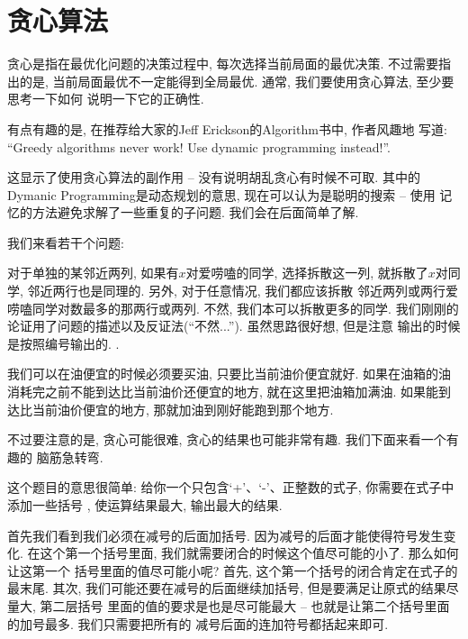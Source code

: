 \section{贪心算法}

贪心是指在最优化问题的决策过程中, 每次选择当前局面的最优决策. 不过需要指出的是, 
当前局面最优不一定能得到全局最优. 通常, 我们要使用贪心算法, 至少要思考一下如何
说明一下它的正确性. 

\begin{remark}
    有点有趣的是, 在推荐给大家的Jeff Erickson的Algorithm\cite{algobook}书中, 作者风趣地
    写道: ``Greedy algorithms never work! Use dynamic programming instead!''.

    这显示了使用贪心算法的副作用 -- 没有说明胡乱贪心有时候不可取. 其中的 
    Dymanic Programming是动态规划的意思, 现在可以认为是聪明的搜索 -- 使用
    记忆的方法避免求解了一些重复的子问题. 我们会在后面简单了解. 
\end{remark}

我们来看若干个问题: 

 对于单独的某邻近两列, 如果有$x$对爱唠嗑的同学, 选择拆散这一列, 
就拆散了$x$对同学, 邻近两行也是同理的. 另外, 对于任意情况, 我们都应该拆散
邻近两列或两行爱唠嗑同学对数最多的那两行或两列. 不然, 我们本可以拆散更多的同学. 
我们刚刚的论证用了问题的描述以及反证法(``不然...''). 虽然思路很好想, 但是注意
输出的时候是按照编号输出的. . 

 我们可以在油便宜的时候必须要买油, 只要比当前油价便宜就好. 
如果在油箱的油消耗完之前不能到达比当前油价还便宜的地方, 就在这里把油箱加满油. 
如果能到达比当前油价便宜的地方, 那就加油到刚好能跑到那个地方. 



不过要注意的是, 贪心可能很难, 贪心的结果也可能非常有趣. 我们下面来看一个有趣的
脑筋急转弯. 

这个题目的意思很简单: 给你一个只包含`+'、`-'、正整数的式子, 你需要在式子中添加一些括号
, 使运算结果最大, 输出最大的结果. 

首先我们看到我们必须在减号的后面加括号. 因为减号的后面才能使得符号发生变化. 
在这个第一个括号里面, 我们就需要闭合的时候这个值尽可能的小了. 那么如何让这第一个
括号里面的值尽可能小呢? 首先, 这个第一个括号的闭合肯定在式子的最末尾. 
其次, 我们可能还要在减号的后面继续加括号, 但是要满足让原式的结果尽量大, 第二层括号
里面的值的要求是也是尽可能最大 -- 也就是让第二个括号里面的加号最多. 我们只需要把所有的
减号后面的连加符号都括起来即可. 

